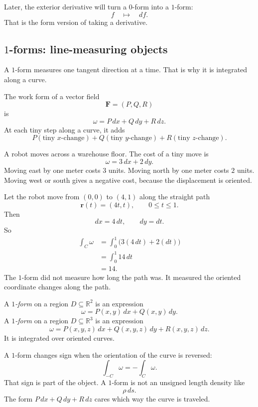 Later, the exterior derivative will turn a \(0\)-form into a \(1\)-form:
\[
    f
    \quad\longmapsto\quad
    df.
\]
That is the form version of taking a derivative.

\subsection{\texorpdfstring{\(1\)}{1}-forms: line-measuring objects}

A \(1\)-form measures one tangent direction at a time.  That is why it is integrated
along a curve.

The work form of a vector field
\[
    \mathbf F=(P,Q,R)
\]
is
\[
    \omega=P\,dx+Q\,dy+R\,dz.
\]
At each tiny step along a curve, it adds
\[
    P(\text{tiny }x\text{-change})
    +
    Q(\text{tiny }y\text{-change})
    +
    R(\text{tiny }z\text{-change}).
\]

\begin{example}
A robot moves across a warehouse floor.  The cost of a tiny move is
\[
    \omega=3\,dx+2\,dy.
\]
Moving east by one meter costs \(3\) units.  Moving north by one meter costs \(2\)
units.  Moving west or south gives a negative cost, because the displacement is oriented.

Let the robot move from \((0,0)\) to \((4,1)\) along the straight path
\[
    \mathbf r(t)=(4t,t),
    \qquad
    0\le t\le1.
\]
Then
\[
    dx=4\,dt,
    \qquad
    dy=dt.
\]
So
\[
\begin{aligned}
    \int_C \omega
    &=
    \int_0^1 \bigl(3(4\,dt)+2(dt)\bigr)\\
    &=
    \int_0^1 14\,dt\\
    &=
    14.
\end{aligned}
\]
The \(1\)-form did not measure how long the path was.  It measured the oriented
coordinate changes along the path.
\end{example}

\begin{definition}[\(1\)-form]
A \emph{\(1\)-form} on a region \(D\subseteq\mathbb R^2\) is an expression
\[
    \omega=P(x,y)\,dx+Q(x,y)\,dy.
\]
A \emph{\(1\)-form} on a region \(D\subseteq\mathbb R^3\) is an expression
\[
    \omega=P(x,y,z)\,dx+Q(x,y,z)\,dy+R(x,y,z)\,dz.
\]
It is integrated over oriented curves.
\end{definition}

A \(1\)-form changes sign when the orientation of the curve is reversed:
\[
    \int_{-C}\omega=-\int_C\omega.
\]
That sign is part of the object.  A \(1\)-form is not an unsigned length density like
\[
    \rho\,ds.
\]
The form \(P\,dx+Q\,dy+R\,dz\) cares which way the curve is traveled.

